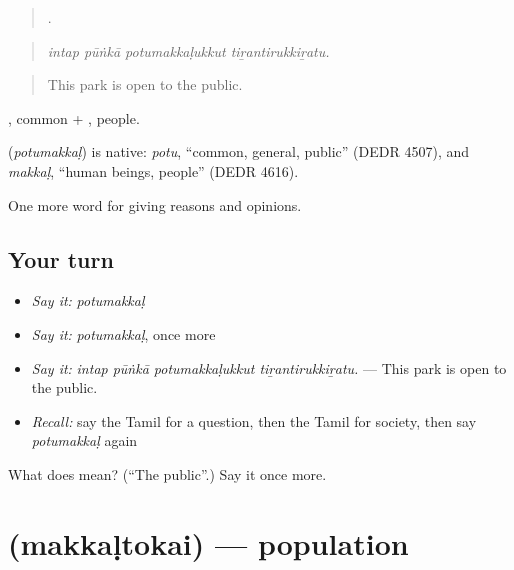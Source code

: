 \begin{quote}
   .
\end{quote}

\begin{quote}
\emph{intap pūṅkā potumakkaḷukkut tiṟantirukkiṟatu.}
\end{quote}

\begin{quote}
This park is open to the public.
\end{quote}

, common + , people.

\begin{cousinweb}
\textbf{} (\emph{potumakkaḷ}) is native: \emph{potu}, \textquotedblleft{}common, general, public\textquotedblright{} (DEDR 4507), and \emph{makkaḷ}, \textquotedblleft{}human beings, people\textquotedblright{} (DEDR 4616).
\end{cousinweb}

\begin{grammarlens}[title={What you've built}]
One more word for giving reasons and opinions.
\end{grammarlens}

\subsection*{Your turn}
\begin{itemize}
\raggedright
  \item \emph{Say it:} \emph{potumakkaḷ}
  \item \emph{Say it:} \emph{potumakkaḷ}, once more
  \item \emph{Say it:} \emph{intap pūṅkā potumakkaḷukkut tiṟantirukkiṟatu.} — This park is open to the public.
  \item \emph{Recall:} say the Tamil for a question, then the Tamil for society, then say \emph{potumakkaḷ} again
\end{itemize}

\begin{tcolorbox}[breakable,colback=teal!4,colframe=teal!35!black,title={Before you move on}]
What does  mean? (\textquotedblleft{}The public\textquotedblright{}.) Say it once more.
\end{tcolorbox}
\section[\texorpdfstring{\ta{மக்கள்தொகை} (makkaḷtokai)}{மக்கள்தொகை (makkaḷtokai)}]{ (makkaḷtokai) — population}


